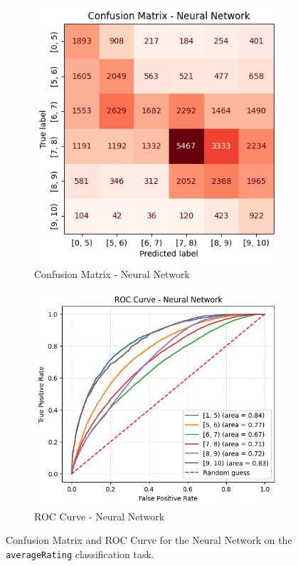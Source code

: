 \begin{figure}[H]
    \centering
    \begin{subfigure}[b]{0.45\textwidth}
        \centering
        \includegraphics[width=\textwidth]{plotsss/cm_nn_rating.png}
        \caption{Confusion Matrix - Neural Network}
        \label{fig:cm_nn_rating}
    \end{subfigure}
    \hfill
    \begin{subfigure}[b]{0.53\textwidth}
        \centering
        \includegraphics[width=\textwidth]{plotsss/roc_nn_rating.png}
        \caption{ROC Curve - Neural Network}
        \label{fig:roc_nn_rating}
    \end{subfigure}
    \caption{Confusion Matrix and ROC Curve for the Neural Network on the \texttt{averageRating} classification task.}
    \label{fig:cm_roc_nn}
\end{figure}


